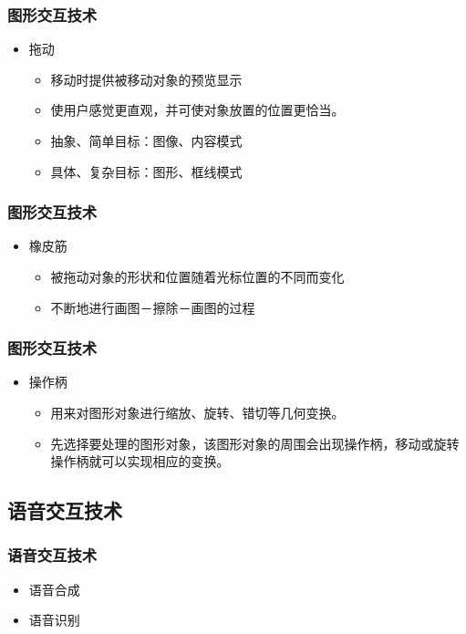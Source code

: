 \documentclass{beamer}
\begin{document}
\begin{frame}
	\frametitle{图形交互技术}
	\begin{itemize}
		\item 拖动
		\begin{itemize}
			\item 移动时提供被移动对象的预览显示
			\item 使用户感觉更直观，并可使对象放置的位置更恰当。
			\item 抽象、简单目标：图像、内容模式
			\item 具体、复杂目标：图形、框线模式
		\end{itemize}
	\end{itemize}
\end{frame}

\begin{frame}
	\frametitle{图形交互技术}
	\begin{itemize}
		\item 橡皮筋
		\begin{itemize}
			\item 被拖动对象的形状和位置随着光标位置的不同而变化
			\item 不断地进行画图－擦除－画图的过程
		\end{itemize}
	\end{itemize}
\end{frame}

\begin{frame}
	\frametitle{图形交互技术}
	\begin{itemize}
		\item 操作柄
		\begin{itemize}
			\item 用来对图形对象进行缩放、旋转、错切等几何变换。
			\item 先选择要处理的图形对象，该图形对象的周围会出现操作柄，移动或旋转操作柄就可以实现相应的变换。
		\end{itemize}
	\end{itemize}
\end{frame}

\subsection{语音交互技术}
\begin{frame}
	\frametitle{语音交互技术}
	\begin{itemize}
		\item 语音合成
		\item 语音识别
	\end{itemize}
\end{frame}
\end{document}
